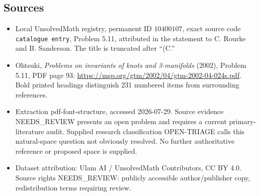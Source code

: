 \documentclass[11pt]{article}
\begin{document}
\subsection{Sources}
\begin{itemize}
\item Local UnsolvedMath registry, permanent ID \(10400107\), exact source code \texttt{catalogue entry}, Problem 5.11, attributed in the statement to C. Rourke and B. Sanderson. The title is truncated after ``(C.''
\item Ohtsuki, \emph{Problems on invariants of knots and 3-manifolds} (2002), Problem 5.11, PDF page 93: \url{https://msp.org/gtm/2002/04/gtm-2002-04-024s.pdf}. Bold printed headings distinguish 231 numbered items from surrounding references.
\item Extraction pdf-font-structure, accessed 2026-07-29. Source evidence NEEDS\_REVIEW presents an open problem and requires a current primary-literature audit. Supplied research classification OPEN-TRIAGE calls this natural-space question not obviously resolved. No further authoritative reference or proposed space is supplied.
\item Dataset attribution: Ulam AI / UnsolvedMath Contributors, CC BY 4.0. Source rights NEEDS\_REVIEW: publicly accessible author/publisher copy, redistribution terms requiring review.
\end{itemize}
\end{document}
